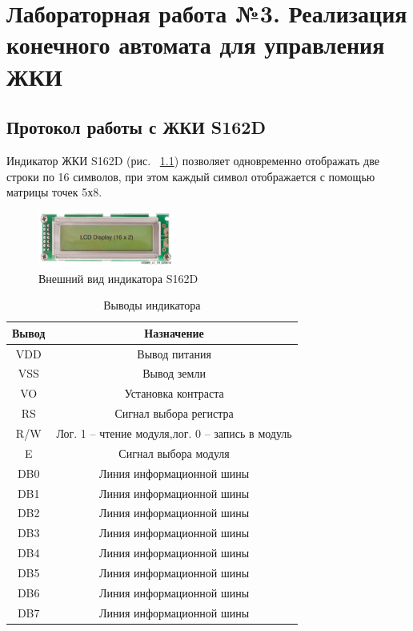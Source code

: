 \chapter{Лабораторная работа №3. Реализация конечного автомата для управления ЖКИ}

\section{Протокол работы с ЖКИ S162D}

Индикатор ЖКИ S162D (рис. ~\ref{LCD1602}) позволяет одновременно отображать две строки по 16 символов, при этом каждый символ отображается с помощью матрицы точек 5х8. 

\begin{figure}[!ht]
	\centering
	\includegraphics[width=0.4\textwidth]{image/LCD1602.PNG}
	\caption{Внешний вид индикатора S162D}
	\label{LCD1602}
\end{figure}

\begin{table}[!ht]
	\begin{center}
		\begin{tabular}{c c}
			\hline\hline
			Вывод & Назначение \\
			\hline
			VDD & Вывод питания \\
			VSS & Вывод земли \\
			VO & Установка контраста \\
			RS & Сигнал выбора регистра \\
			R/W & Лог. 1 – чтение модуля,лог. 0 – запись в модуль \\
			E & Сигнал выбора модуля \\
			DB0 & Линия информационной шины \\
			DB1 & Линия информационной шины \\
			DB2 & Линия информационной шины \\
			DB3 & Линия информационной шины \\
			DB4 & Линия информационной шины \\
			DB5 & Линия информационной шины \\
			DB6 & Линия информационной шины \\
			DB7 & Линия информационной шины \\
			\hline
		\end{tabular}
		\caption{Выводы индикатора}
		\label{LCD_PIN}
	\end{center}
\end{table}


